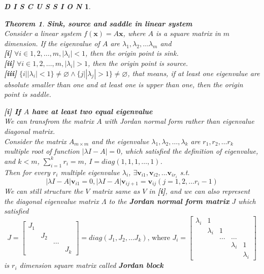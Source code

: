 \documentclass[12pt]{article}
\theoremstyle{plain}
\newtheorem{theorem}{\textbf{Theorem}}[section]
\newtheorem{discussion}{\textit{D I S C U S S I O N}}[section]
\begin{document}
\begin{discussion}
\begin{theorem}\label{sink-source-saddle-linear-system}\textbf{Sink, source and saddle in linear system}
\\\noindent Consider a linear system $f(\mathbf x) = A \mathbf x$, where $A$ is a square matrix in $m$ dimension. If the eigenvalue of $A$ are $\lambda_1, \lambda_2, \ldots \lambda_m$ and
\\\noindent \textbf{[i]} $\forall i \in 1, 2, \ldots, m, |\lambda_i| < 1$, then the origin point is sink.
\\\noindent \textbf{[ii]} $\forall i \in 1, 2, \ldots, m, |\lambda_i| > 1$, then the origin point is source.
\\\noindent \textbf{[iii]} $\{i | |\lambda_i| < 1\} \neq \varnothing \land \{j | |\lambda_j| > 1\} \neq \varnothing$, that means, if at least one eigenvalue are absolute smaller than one and at least one is upper than one, then the origin point is saddle.\\[1ex]
\end{theorem}





  \noindent \textbf{[i] If $A$ have at least two equal eigenvalue} 
\\\noindent We can transfrom the matrix $A$ with Jordan normal form rather than eigenvalue diagonal matrix.
\\\noindent Consider the matrix $A_{m\times m}$ and the eigenvalue $\lambda_{1}, \lambda_{2}, \ldots, \lambda_{k}$ are $r_1, r_2, \ldots r_k$ multiple root of function $|\lambda I - A| = 0$, which satisfied the definition of eigenvalue, and $k < m$, $\sum_{i = 1}^{k} r_i = m$, $I = diag(1, 1, 1, \ldots, 1)$. 
\\\noindent Then for every $r_i$ multiple eigenvalue $\lambda_i$, $\exists \mathbf v_{i1}, \mathbf v_{i2}, \ldots \mathbf v_{i r_i}$ s.t.
$$
|\lambda I - A|\mathbf v_{i1} = 0, |\lambda I - A|\mathbf v_{ij+1} = \mathbf v_{ij}(j = 1, 2, \ldots r_i - 1)
$$
We can still structure the $V$ matrix same as $V$ in \textbf{[i]}, and we can also represent the diagonal eigenvalue matrix $\Lambda$ to the \textbf{ Jordan normal form matrix} $J$ which satisfied 
$$
J = \left[
\begin{array}{cccc}
J_{1} \\
& J_{2} \\
& & \ldots \\
& & & J_{k}
\end{array}
\right] = diag(J_1, J_2, \ldots J_k) \text{, where } J_i =\left[
\begin{array}{ccccc}
\lambda_i & 1 \\
& \lambda_i & 1 \\
& & \ldots & \ldots \\
& & & \lambda_i & 1 \\
& & & & \lambda_i
\end{array} \right]
$$
is $r_i$ dimension square matrix called \textbf{Jordan block}


\end{discussion}
\end{document}
